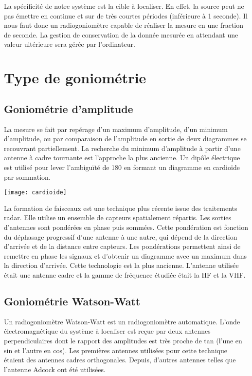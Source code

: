 La spécificité de notre système est la cible à localiser. En effet, la source peut ne pas émettre en  continue et sur de très courtes périodes (inférieure à 1 seconde). Il nous faut donc un radiogoniomètre capable de réaliser la mesure en une fraction de seconde. La gestion de conservation de la donnée mesurée en attendant une valeur ultérieure sera gérée par l’ordinateur.


\section{Type de goniométrie}

\subsection{Goniométrie d'amplitude}

	La mesure se fait par repérage d’un maximum d’amplitude, d’un minimum d’amplitude, ou par comparaison de l’amplitude en sortie de deux diagrammes se recouvrant partiellement. La recherche du minimum d’amplitude à partir d’une antenne à cadre tournante est l’approche la plus ancienne. Un dipôle électrique est utilisé pour lever l’ambiguïté de 180 en formant un diagramme en cardioïde par sommation.
	
\texttt{[image: cardioide]}
\parindent=15pt

	La formation de faisceaux est une technique plus récente issue des traitements radar. Elle utilise un ensemble de capteurs spatialement répartis. Les sorties d’antennes sont pondérées en phase puis sommées. Cette pondération est fonction du déphasage progressif d’une antenne à une autre, qui dépend de la direction d’arrivée et de la distance entre capteurs. Les pondérations permettent ainsi de remettre en phase les signaux et d’obtenir un diagramme avec un maximum dans la direction d’arrivée.
 Cette technologie est la plus ancienne. L’antenne utilisée était une antenne cadre et la gamme de fréquence étudiée était la HF et la VHF.

\subsection{Goniométrie Watson-Watt}
\label{Watson-Watt}

	Un radiogoniomètre Watson-Watt est un radiogoniomètre automatique. L’onde électromagnétique du système à localiser est reçue par deux antennes perpendiculaires dont le rapport des amplitudes est très proche de tan (l’une en sin et l’autre en cos). Les premières antennes utilisées pour cette technique étaient des antennes cadres orthogonales. Depuis, d'autres antennes telles que l'antenne Adcock ont été utilisées.

